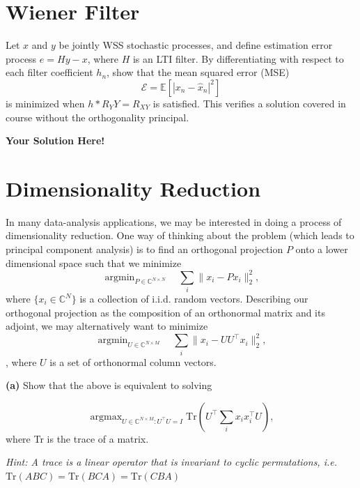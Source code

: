 \documentclass[12pt]{article}
\newcommand{\expect}[1]{\mathbb{E}\left[#1\right]}
\newcommand{\0}{\mathbf{0}}
\newcommand{\1}{\mathbf{1}}
\newcommand{\trace}{\text{Tr}}
\DeclareMathOperator*{\argmin}{\text{argmin}}
\DeclareMathOperator*{\argmax}{\text{argmax}}
\newcommand{\solspace}{\vspace{3mm} \textbf{Your Solution Here!} \vspace{3mm}}
\begin{document}
\rhead{\today}
 
\section{Wiener Filter}
Let $x$ and $y$ be jointly WSS stochastic processes, and define estimation error process $e = Hy - x$, where $H$ is an LTI filter. By differentiating with respect to each filter coefficient $h_n$, show that the mean squared error (MSE)
\begin{equation}
    \mathcal{E} = \expect{|x_n - \hat{x}_n|^2}
\end{equation}
is minimized when $h \ast R_YY = R_{XY}$ is satisfied. This verifies a solution covered in course without the orthogonality principal.

\solspace

\pagebreak
\section{Dimensionality Reduction}
In many data-analysis applications, we may be interested in doing a process of dimensionality reduction. One way of thinking about the problem (which leads to principal component analysis) is to find an orthogonal projection $P$ onto a lower dimensional space such that we minimize
\begin{equation}
    \argmin_{P \in \mathbb{C}^{N \times N}} \quad \sum_i \| x_i - Px_i\|_2^2,
\end{equation}
where $\{x_i \in \mathbb{C}^N\}$ is a collection of i.i.d. random vectors. 
Describing our orthogonal projection as the composition of an orthonormal matrix and its adjoint, we may alternatively want to minimize
\begin{equation}
    \argmin_{U \in \mathbb{C}^{N \times M}} \quad \sum_i \| x_i - U U^\top x_i\|_2^2,
\end{equation},
where $U$ is a set of orthonormal column vectors.


\textbf{(a)}
Show that the above is equivalent to solving

\begin{equation}
    \argmax_{U \in \mathbb{C}^{N \times M} : U^\top U = I} \trace\left(U^\top \sum_i x_i x_i^\top U\right),
\end{equation}
where Tr is the trace of a matrix.

\textit{Hint: A trace is a linear operator that is invariant to cyclic permutations, i.e. $\trace(ABC) = \trace(BCA) = \trace(CBA)$}
\end{document}
